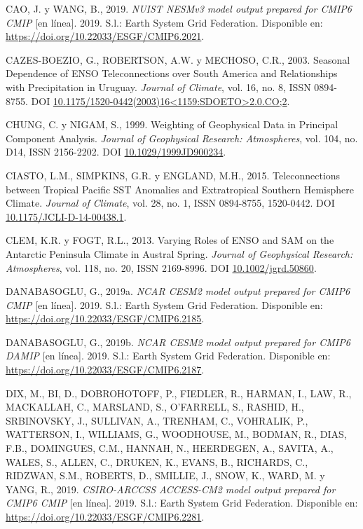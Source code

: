 \documentclass[12pt,oneside,a4paper]{reedthesis}
\newlength{\cslhangindent}
\newenvironment{CSLReferences}[2] %
 {%
  \setlength{\parindent}{0pt}
  \ifodd #1 \everypar{\setlength{\hangindent}{\cslhangindent}}\ignorespaces\fi
  \ifnum #2 > 0
  \setlength{\parskip}{#2\baselineskip}
  \fi
 }%
 {}
\begin{document}
\begin{CSLReferences}{1}{0}
\leavevmode{}%
CAO, J. y WANG, B., 2019. \emph{NUIST NESMv3 model output prepared for CMIP6 CMIP} {[}en línea{]}. 2019. S.l.: Earth System Grid Federation. Disponible en: \url{https://doi.org/10.22033/ESGF/CMIP6.2021}.

\leavevmode{}%
CAZES-BOEZIO, G., ROBERTSON, A.W. y MECHOSO, C.R., 2003. Seasonal {Dependence} of {ENSO Teleconnections} over {South America} and {Relationships} with {Precipitation} in {Uruguay}. \emph{Journal of Climate}, vol. 16, no. 8, ISSN 0894-8755. DOI \href{https://doi.org/10.1175/1520-0442(2003)16\%3C1159:SDOETO\%3E2.0.CO;2}{10.1175/1520-0442(2003)16\textless1159:SDOETO\textgreater2.0.CO;2}.

\leavevmode{}%
CHUNG, C. y NIGAM, S., 1999. Weighting of Geophysical Data in {Principal Component Analysis}. \emph{Journal of Geophysical Research: Atmospheres}, vol. 104, no. D14, ISSN 2156-2202. DOI \href{https://doi.org/10.1029/1999JD900234}{10.1029/1999JD900234}.

\leavevmode{}%
CIASTO, L.M., SIMPKINS, G.R. y ENGLAND, M.H., 2015. Teleconnections between {Tropical Pacific SST Anomalies} and {Extratropical Southern Hemisphere Climate}. \emph{Journal of Climate}, vol. 28, no. 1, ISSN 0894-8755, 1520-0442. DOI \href{https://doi.org/10.1175/JCLI-D-14-00438.1}{10.1175/JCLI-D-14-00438.1}.

\leavevmode{}%
CLEM, K.R. y FOGT, R.L., 2013. Varying Roles of {ENSO} and {SAM} on the {Antarctic Peninsula} Climate in Austral Spring. \emph{Journal of Geophysical Research: Atmospheres}, vol. 118, no. 20, ISSN 2169-8996. DOI \href{https://doi.org/10.1002/jgrd.50860}{10.1002/jgrd.50860}.

\leavevmode{}%
DANABASOGLU, G., 2019a. \emph{NCAR CESM2 model output prepared for CMIP6 CMIP} {[}en línea{]}. 2019. S.l.: Earth System Grid Federation. Disponible en: \url{https://doi.org/10.22033/ESGF/CMIP6.2185}.

\leavevmode{}%
DANABASOGLU, G., 2019b. \emph{NCAR CESM2 model output prepared for CMIP6 DAMIP} {[}en línea{]}. 2019. S.l.: Earth System Grid Federation. Disponible en: \url{https://doi.org/10.22033/ESGF/CMIP6.2187}.

\leavevmode{}%
DIX, M., BI, D., DOBROHOTOFF, P., FIEDLER, R., HARMAN, I., LAW, R., MACKALLAH, C., MARSLAND, S., O'FARRELL, S., RASHID, H., SRBINOVSKY, J., SULLIVAN, A., TRENHAM, C., VOHRALIK, P., WATTERSON, I., WILLIAMS, G., WOODHOUSE, M., BODMAN, R., DIAS, F.B., DOMINGUES, C.M., HANNAH, N., HEERDEGEN, A., SAVITA, A., WALES, S., ALLEN, C., DRUKEN, K., EVANS, B., RICHARDS, C., RIDZWAN, S.M., ROBERTS, D., SMILLIE, J., SNOW, K., WARD, M. y YANG, R., 2019. \emph{CSIRO-ARCCSS ACCESS-CM2 model output prepared for CMIP6 CMIP} {[}en línea{]}. 2019. S.l.: Earth System Grid Federation. Disponible en: \url{https://doi.org/10.22033/ESGF/CMIP6.2281}.


\end{CSLReferences}
\end{document}
